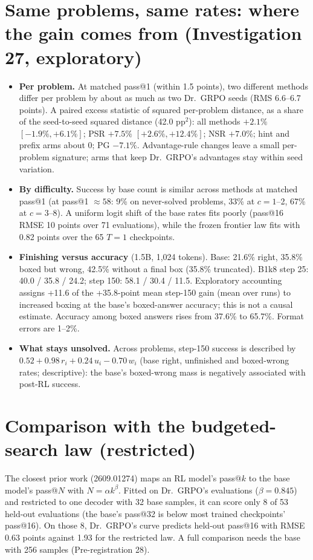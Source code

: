 \documentclass[11pt]{article}
\begin{document}
\section{Same problems, same rates: where the gain comes from (Investigation 27, exploratory)}
\begin{found}
\begin{itemize}[leftmargin=*,itemsep=1pt]
\item \textbf{Per problem.} At matched pass@1 (within 1.5 points), two different methods differ per problem by about as much as two Dr.\ GRPO seeds (RMS 6.6--6.7 points). A paired excess statistic of squared per-problem distance, as a share of the seed-to-seed squared distance (42.0 pp$^2$): all methods $+2.1\%$ $[-1.9\%,+6.1\%]$; PSR $+7.5\%$ $[+2.6\%,+12.4\%]$; NSR $+7.0\%$; hint and prefix arms about 0; PG $-7.1\%$. Advantage-rule changes leave a small per-problem signature; arms that keep Dr.\ GRPO's advantages stay within seed variation.
\item \textbf{By difficulty.} Success by base count is similar across methods at matched pass@1 (at pass@1 $\approx58$: 9\% on never-solved problems, 33\% at $c=1$--2, 67\% at $c=3$--8). A uniform logit shift of the base rates fits poorly (pass@16 RMSE 10 points over 71 evaluations), while the frozen frontier law fits with 0.82 points over the 65 $T=1$ checkpoints.
\item \textbf{Finishing versus accuracy} (1.5B, 1,024 tokens). Base: 21.6\% right, 35.8\% boxed but wrong, 42.5\% without a final box (35.8\% truncated). B1k8 step 25: 40.0 / 35.8 / 24.2; step 150: 58.1 / 30.4 / 11.5. Exploratory accounting assigns +11.6 of the +35.8-point mean step-150 gain (mean over runs) to increased boxing at the base's boxed-answer accuracy; this is not a causal estimate. Accuracy among boxed answers rises from 37.6\% to 65.7\%. Format errors are 1--2\%.
\item \textbf{What stays unsolved.} Across problems, step-150 success is described by $0.52+0.98\,r_i+0.24\,u_i-0.70\,w_i$ (base right, unfinished and boxed-wrong rates; descriptive): the base's boxed-wrong mass is negatively associated with post-RL success.
\end{itemize}
\end{found}

\section{Comparison with the budgeted-search law (restricted)}
The closest prior work (2609.01274) maps an RL model's pass@$k$ to the base model's pass@$N$ with $N=\alpha k^\beta$. Fitted on Dr.\ GRPO's evaluations ($\beta=0.845$) and restricted to one decoder with 32 base samples, it can score only 8 of 53 held-out evaluations (the base's pass@32 is below most trained checkpoints' pass@16). On those 8, Dr.\ GRPO's curve predicts held-out pass@16 with RMSE 0.63 points against 1.93 for the restricted law. A full comparison needs the base with 256 samples (Pre-registration 28).
\end{document}
